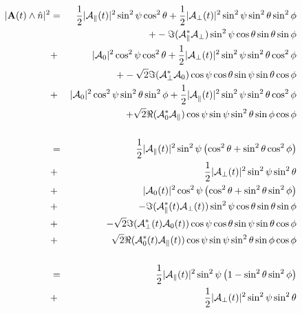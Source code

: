\documentclass[a4paper,9pt,twoside]{article}
\begin{document}
\begin{eqnarray}
  |{ \bf A}(t) \wedge \hat{n}|^2 &=& 
                                  \frac{1}{2} |{\cal A}_\parallel(t)|^2 \sin^2\psi \cos^2\theta  +  \frac{1 }{2}|{\cal A}_\perp(t)|^2\sin^2\psi\sin^2\theta\sin^2\phi  \\
                              &&+     -\Im({\cal A}_\parallel^*{\cal A}_\perp)\sin^2\psi\cos\theta\sin\theta\sin\phi  \\
                              &+&     |{\cal A}_0|^2 \cos^2\psi\cos^2\theta  + \frac{1}{2} |{\cal A}_\perp(t)|^2\sin^2\psi \sin^2\theta\cos^2\phi \\
                              &&+     -\sqrt{2}\Im({\cal A}_\perp^* {\cal A}_0 )\cos\psi\cos\theta\sin\psi\sin\theta\cos\phi \\
                              &+&     |{\cal A}_0|^2 \cos^2\psi\sin^2\theta\sin^2\phi  + \frac{1}{2}{|\cal A}_\parallel(t)|^2 \sin^2\psi \sin^2\theta\cos^2\phi       \\
                              &&+     \sqrt{2}\Re({\cal A}_0^*{\cal A}_\parallel  )\cos\psi\sin\psi\sin^2\theta\sin\phi\cos\phi\\
                              && \\
                              &=&\frac{1}{2}|{\cal A}_\parallel(t)|^2 \sin^2\psi \left( \cos^2\theta + \sin^2\theta\cos^2\phi    \right)  \\
                              &+&\frac{1}{2}|{\cal A}_\perp(t)|^2\sin^2\psi\sin^2\theta \\
                              &+&   |{\cal A}_0(t)|^2 \cos^2\psi\left( \cos^2\theta  +  \sin^2\theta\sin^2\phi\right) \\
                              &+&     -\Im({\cal A}_\parallel^*(t){\cal A}_\perp(t))\sin^2\psi\cos\theta\sin\theta\sin\phi  \\
                              &+&     -\sqrt{2}\Im({\cal A}_\perp^*(t) {\cal A}_0(t) )\cos\psi\cos\theta\sin\psi\sin\theta\cos\phi \\
                              &+&     \sqrt{2}\Re({\cal A}_0^*(t){\cal A}_\parallel(t)  )\cos\psi\sin\psi\sin^2\theta\sin\phi\cos\phi\\
                              && \\
                              &=&\frac{1}{2}|{\cal A}_\parallel(t)|^2 \sin^2\psi \left( 1 -  \sin^2\theta\sin^2\phi    \right)  \\
                              &+&\frac{1}{2}|{\cal A}_\perp(t)|^2\sin^2\psi\sin^2\theta \\

\end{eqnarray}
\end{document}
